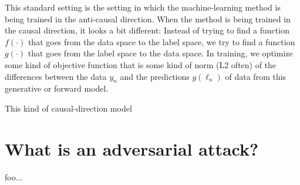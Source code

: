 \documentclass[12pt, letterpaper]{article}
\begin{document}
This standard setting is the setting in which the machine-learning
method is being trained in the anti-causal direction.
When the method is being trained in the causal direction, it looks a
bit different:
Instead of trying to find a function $f(\cdot)$ that goes from the
data space to the label space, we try to find a function $g(\cdot)$
that goes from the label space to the data space.
In training, we optimize some kind of objective function
that is some kind of norm (L2 often) of the differences
between the data $y_n$ and the predictions $g(\ell_n)$ of data
from this generative or forward model.

This kind of causal-direction model 

\section{What is an adversarial attack?}

foo...
\end{document}
